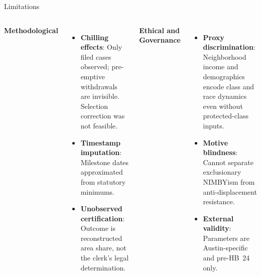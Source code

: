 \documentclass[10pt, aspectratio=169]{beamer}
\begin{document}
\begin{frame}{Limitations}
 \begin{columns}
 \textbf{Methodological}
 \begin{itemize}
 \item \textbf{Chilling effects}: Only filed cases observed; pre-emptive withdrawals are invisible. Selection correction was not feasible.
 \item \textbf{Timestamp imputation}: Milestone dates approximated from statutory minimums.
 \item \textbf{Unobserved certification}: Outcome is reconstructed area share, not the clerk's legal determination.
 \end{itemize}

 \textbf{Ethical and Governance}
 \begin{itemize}
 \item \textbf{Proxy discrimination}: Neighborhood income and demographics encode class and race dynamics even without protected-class inputs.
 \item \textbf{Motive blindness}: Cannot separate exclusionary NIMBYism from anti-displacement resistance.
 \item \textbf{External validity}: Parameters are Austin-specific and pre-HB~24 only.
 \end{itemize}
 \end{columns}
\end{frame}
\end{document}
